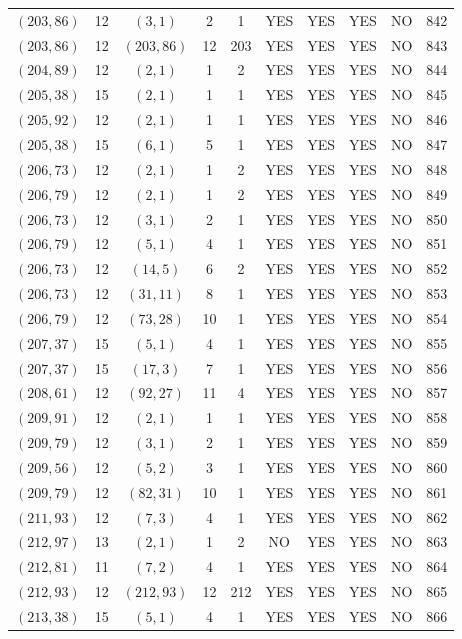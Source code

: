 \begin{longtable}{|c|c|c|c|c|c|c|c|c|c|}
$(203, 86)$ & 12 & $(3, 1)$ & 2 & 1 & YES & YES & YES & NO & 842\\
$(203, 86)$ & 12 & $(203, 86)$ & 12 & 203 & YES & YES & YES & NO & 843\\
$(204, 89)$ & 12 & $(2, 1)$ & 1 & 2 & YES & YES & YES & NO & 844\\
$(205, 38)$ & 15 & $(2, 1)$ & 1 & 1 & YES & YES & YES & NO & 845\\
$(205, 92)$ & 12 & $(2, 1)$ & 1 & 1 & YES & YES & YES & NO & 846\\
$(205, 38)$ & 15 & $(6, 1)$ & 5 & 1 & YES & YES & YES & NO & 847\\
$(206, 73)$ & 12 & $(2, 1)$ & 1 & 2 & YES & YES & YES & NO & 848\\
$(206, 79)$ & 12 & $(2, 1)$ & 1 & 2 & YES & YES & YES & NO & 849\\
$(206, 73)$ & 12 & $(3, 1)$ & 2 & 1 & YES & YES & YES & NO & 850\\
$(206, 79)$ & 12 & $(5, 1)$ & 4 & 1 & YES & YES & YES & NO & 851\\
$(206, 73)$ & 12 & $(14, 5)$ & 6 & 2 & YES & YES & YES & NO & 852\\
$(206, 73)$ & 12 & $(31, 11)$ & 8 & 1 & YES & YES & YES & NO & 853\\
$(206, 79)$ & 12 & $(73, 28)$ & 10 & 1 & YES & YES & YES & NO & 854\\
$(207, 37)$ & 15 & $(5, 1)$ & 4 & 1 & YES & YES & YES & NO & 855\\
$(207, 37)$ & 15 & $(17, 3)$ & 7 & 1 & YES & YES & YES & NO & 856\\
$(208, 61)$ & 12 & $(92, 27)$ & 11 & 4 & YES & YES & YES & NO & 857\\
$(209, 91)$ & 12 & $(2, 1)$ & 1 & 1 & YES & YES & YES & NO & 858\\
$(209, 79)$ & 12 & $(3, 1)$ & 2 & 1 & YES & YES & YES & NO & 859\\
$(209, 56)$ & 12 & $(5, 2)$ & 3 & 1 & YES & YES & YES & NO & 860\\
$(209, 79)$ & 12 & $(82, 31)$ & 10 & 1 & YES & YES & YES & NO & 861\\
$(211, 93)$ & 12 & $(7, 3)$ & 4 & 1 & YES & YES & YES & NO & 862\\
$(212, 97)$ & 13 & $(2, 1)$ & 1 & 2 & NO & YES & YES & NO & 863\\
$(212, 81)$ & 11 & $(7, 2)$ & 4 & 1 & YES & YES & YES & NO & 864\\
$(212, 93)$ & 12 & $(212, 93)$ & 12 & 212 & YES & YES & YES & NO & 865\\
$(213, 38)$ & 15 & $(5, 1)$ & 4 & 1 & YES & YES & YES & NO & 866\\

\end{longtable}
